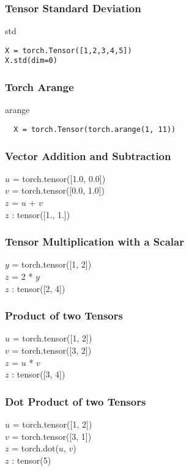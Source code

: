 \documentclass[14 pt]{beamer}
\begin{document}
\begin{frame}[fragile]
  \frametitle{Tensor Standard Deviation}
  \begin{block}{std}
\begin{verbatim}
X = torch.Tensor([1,2,3,4,5])
X.std(dim=0)
\end{verbatim}
  \end{block}
\end{frame}

\begin{frame}[fragile]
  \frametitle{Torch Arange}
  \begin{block}{arange}
\begin{verbatim}
  X = torch.Tensor(torch.arange(1, 11))
\end{verbatim}
  \end{block}
\end{frame}


\begin{frame}
  \frametitle{Vector Addition and Subtraction}
  \begin{block}{}
    $u$ = torch.tensor([1.0, 0.0]) \\
    $v$ = torch.tensor([0.0, 1.0]) \\
    $z$ = $u$ + $v$ \\
    $z$ : tensor([1., 1.])
  \end{block}
\end{frame}

\begin{frame}
  \frametitle{Tensor Multiplication with a Scalar}
  \begin{block}{}
    $y$ = torch.tensor([1, 2]) \\
    $z$ = 2 * $y$ \\
    $z$ : tensor([2, 4])
  \end{block}
\end{frame}

\begin{frame}
  \frametitle{Product of two Tensors}
  \begin{block}{}
    $u$ = torch.tensor([1, 2]) \\
    $v$ = torch.tensor([3, 2])\\
    $z$ = $u$ * $v$ \\
    $z$ : tensor([3, 4])
  \end{block}
\end{frame}

\begin{frame}
  \frametitle{Dot Product of two Tensors}
  \begin{block}{}
    $u$ = torch.tensor([1, 2]) \\
    $v$ = torch.tensor([3, 1])\\
    $z$ = torch.dot($u$, $v$) \\
    $z$ : tensor(5)
  \end{block}
\end{frame}
\end{document}
